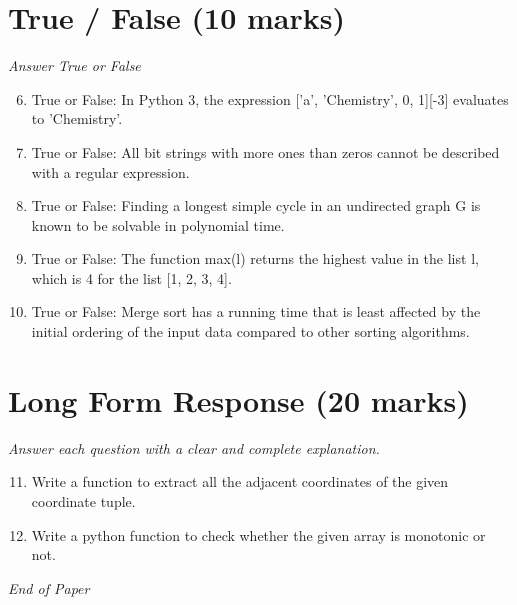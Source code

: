 \documentclass[12pt]{article}
\begin{document}
\section*{True / False (10 marks)}
\textit{Answer True or False}
\begin{enumerate}[label=\arabic*.]
\setcounter{enumi}{5}
\item True or False: In Python 3, the expression ['a', 'Chemistry', 0, 1][-3] evaluates to 'Chemistry'.
\item True or False: All bit strings with more ones than zeros cannot be described with a regular expression.
\item True or False: Finding a longest simple cycle in an undirected graph G is known to be solvable in polynomial time.
\item True or False: The function max(l) returns the highest value in the list l, which is 4 for the list [1, 2, 3, 4].
\item True or False: Merge sort has a running time that is least affected by the initial ordering of the input data compared to other sorting algorithms.
\end{enumerate}

\section*{Long Form Response (20 marks)}
\textit{Answer each question with a clear and complete explanation.}
\begin{enumerate}[label=\arabic*.]
\setcounter{enumi}{10}
\item Write a function to extract all the adjacent coordinates of the given coordinate tuple.
\item Write a python function to check whether the given array is monotonic or not.
\end{enumerate}

\vfill
\noindent\textit{End of Paper}
\end{document}
